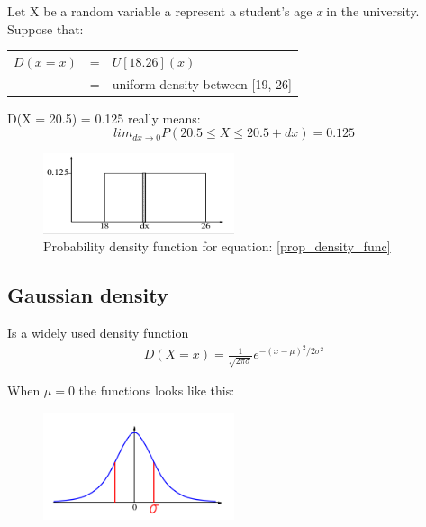 Let X be a random variable a represent a student's age \textit{x} in the university.\\
Suppose that:\\

\begin{table}
\centering
\begin{tabular}{l l l}
$D(x = x)$ & = & $U[18. 26](x)$ \\
 & = & uniform density between [19, 26]
\end{tabular}
\end{table}

D(X = 20.5) = 0.125 really means:\\
\begin{equation}\label{prop_density_func}
lim_{dx \rightarrow 0}P(20.5 \leq X \leq 20.5 + dx) = 0.125
\end{equation}

\begin{figure}[h]
\centering
\includegraphics[width=0.5\textwidth]{chap2_pics/prop_density_function.png} 
\caption{Probability density function for equation: \ref{prop_density_func}}
\end{figure}

\subsection{Gaussian density}
\begin{theorem}
Is a widely used density function
\begin{align}
D(X = x) = \frac{1}{\sqrt{2 \pi \sigma}}e^{-(x-\mu )^2/2\sigma^2}
\end{align}
\end{theorem}

When $\mu = 0$ the functions looks like this:\\

\begin{figure}[h]
\centering
\includegraphics[width=0.5\textwidth]{chap2_pics/gausian_density_func.png} 
\end{figure}

